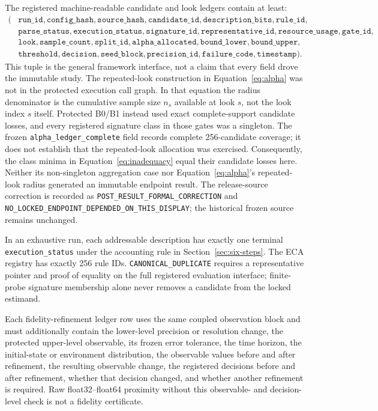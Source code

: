 The registered machine-readable candidate and look ledgers contain at least:
\[
\begin{split}
(&\texttt{run\_id},\texttt{config\_hash},\texttt{source\_hash},
\texttt{candidate\_id},\texttt{description\_bits},\texttt{rule\_id},\\
&\texttt{parse\_status},\texttt{execution\_status},\texttt{signature\_id},
\texttt{representative\_id},\texttt{resource\_usage},\texttt{gate\_id},\\
&\texttt{look},\texttt{sample\_count},\texttt{split\_id},
\texttt{alpha\_allocated},\texttt{bound\_lower},\texttt{bound\_upper},\\
&\texttt{threshold},\texttt{decision},\texttt{seed\_block},
\texttt{precision\_id},\texttt{failure\_code},\texttt{timestamp}).
\end{split}
\]
This tuple is the general framework interface, not a claim that every field drove the immutable
study. The repeated-look construction in Equation~\eqref{eq:alpha} was not in the protected
execution call graph. In that equation the radius denominator is the cumulative sample size
\(n_s\) available at look \(s\), not the look index \(s\) itself. Protected B0/B1 instead used
exact complete-support candidate losses, and every registered signature class in those gates was a
singleton. The frozen \texttt{alpha\_ledger\_complete} field records complete 256-candidate
coverage; it does not establish that the repeated-look allocation was exercised. Consequently,
the class minima in Equation~\eqref{eq:inadequacy} equal their candidate losses here. Neither its
non-singleton aggregation case nor Equation~\eqref{eq:alpha}'s repeated-look radius generated an
immutable endpoint result.
The release-source correction is recorded as
\texttt{POST\_RESULT\_FORMAL\_CORRECTION} and
\texttt{NO\_LOCKED\_ENDPOINT\_DEPENDED\_ON\_THIS\_DISPLAY}; the historical frozen source remains
unchanged.

In an exhaustive run, each addressable description has exactly one terminal
\texttt{execution\_status} under the accounting rule in Section~\ref{sec:six-steps}. The ECA
registry has exactly 256
rule IDs. \texttt{CANONICAL\_DUPLICATE} requires a representative pointer and proof of equality on
the full registered evaluation interface; finite-probe signature membership alone never removes a
candidate from the locked estimand.

Each fidelity-refinement ledger row uses the same coupled observation block and must additionally
contain the lower-level precision or
resolution change, the protected upper-level observable, its frozen error tolerance, the time
horizon, the initial-state or environment distribution, the observable values before and after
refinement, the resulting observable change, the registered decisions before and after
refinement, whether that decision changed, and whether another refinement is required. Raw
float32--float64 proximity without this observable- and decision-level check is not a fidelity
certificate.

